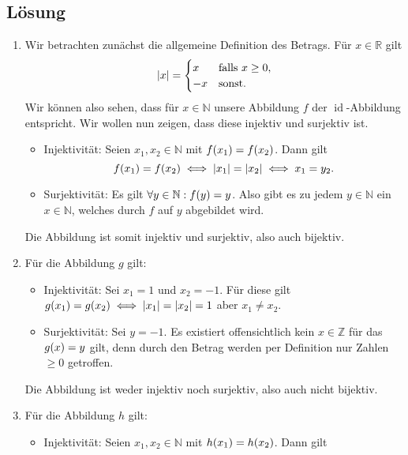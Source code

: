 \documentclass[german,12pt]{homework}
\newcommand{\NN}{\mathbb{N}}
\newcommand{\ZZ}{\mathbb{Z}}
\newcommand{\RR}{\mathbb{R}}
\DeclareMathOperator{\id}{id}
\DeclarePairedDelimiter{\absolute}{\lvert}{\rvert}
\DeclarePairedDelimiter{\enbrace}{(}{)}
\begin{document}
    \subsection*{Lösung}
    \begin{enumerate}
        \item Wir betrachten zunächst die allgemeine Definition des Betrags.
        Für \(x \in \RR\) gilt
        \[\absolute*{x} = \begin{cases}
            x & \text{falls }x \ge 0,\\
            -x & \text{sonst.}
        \end{cases}\]
        Wir können also sehen, dass für \(x \in \NN\) unsere Abbildung \(f\)
        der \(\id\)-Abbildung entspricht. Wir wollen nun zeigen, dass diese
        injektiv und surjektiv ist.
        \begin{itemize}
            \item Injektivität: Seien \(x_1, x_2 \in \NN\) mit \(f\enbrace*{x_1} = f\enbrace*{x_2}\). Dann gilt
            \[f\enbrace*{x_1} = f\enbrace*{x_2} \iff \absolute*{x_1} = \absolute*{x_2} \iff x_1 = y_2.\]
            \item Surjektivität: Es gilt \({\forall}y \in \NN: f\enbrace*{y} = y\). Also gibt es zu jedem \(y \in \NN\) ein \(x \in \NN\), welches durch \(f\) auf \(y\) abgebildet wird.
        \end{itemize}
        Die Abbildung ist somit injektiv und surjektiv, also auch bijektiv.
        \item Für die Abbildung \(g\) gilt:
        \begin{itemize}
            \item Injektivität: Sei \(x_1 = 1\) und \(x_2 = -1\). Für diese
            gilt \(g\enbrace*{x_1} = g\enbrace*{x_2} \iff \absolute*{x_1} =
            \absolute*{x_2} = 1\) aber \(x_1 \ne x_2\).
            \item Surjektivität: Sei \(y = -1\). Es existiert offensichtlich
            kein \(x \in \ZZ\) für das \(g\enbrace*{x} = y\) gilt, denn durch
            den Betrag werden per Definition nur Zahlen \(\ge 0\) getroffen.
        \end{itemize}
        Die Abbildung ist weder injektiv noch surjektiv, also auch nicht
        bijektiv.
        \item Für die Abbildung \(h\) gilt:
        \begin{itemize}
            \item Injektivität: Seien \(x_1, x_2 \in \NN\) mit
            \(h\enbrace*{x_1} = h\enbrace*{x_2}\). Dann gilt

\end{itemize}
\end{enumerate}
\end{document}
